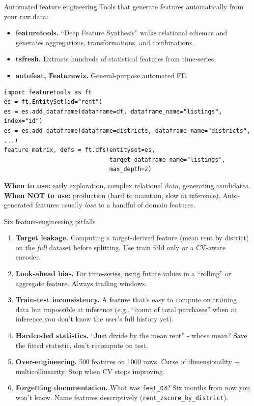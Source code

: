 \documentclass[aspectratio=169]{beamer}
\begin{document}
\begin{frame}[fragile]{Automated feature engineering}
  Tools that generate features automatically from your raw data:
  \vfill
  \begin{itemize}
    \item \textbf{featuretools.} ``Deep Feature Synthesis'' walks relational schemas and generates aggregations, transformations, and combinations.
    \item \textbf{tsfresh.} Extracts hundreds of statistical features from time-series.
    \item \textbf{autofeat, Featurewiz.} General-purpose automated FE.
  \end{itemize}
  \vfill
{\lstset{basicstyle=\ttfamily\scriptsize}
\begin{lstlisting}
import featuretools as ft
es = ft.EntitySet(id="rent")
es = es.add_dataframe(dataframe=df, dataframe_name="listings", index="id")
es = es.add_dataframe(dataframe=districts, dataframe_name="districts", ...)
feature_matrix, defs = ft.dfs(entityset=es,
                              target_dataframe_name="listings",
                              max_depth=2)
\end{lstlisting}}
  \vfill
  \footnotesize \textbf{When to use:} early exploration, complex relational data, generating candidates.\\
  \textbf{When NOT to use:} production (hard to maintain, slow at inference). Auto-generated features usually \emph{lose} to a handful of domain features.
\end{frame}

\begin{frame}{Six feature-engineering pitfalls}
  \begin{enumerate}
    \item \textbf{Target leakage.} Computing a target-derived feature (mean rent by district) on the \emph{full} dataset before splitting. Use train fold only or a CV-aware encoder.
    \item \textbf{Look-ahead bias.} For time-series, using future values in a ``rolling'' or aggregate feature. Always trailing windows.
    \item \textbf{Train-test inconsistency.} A feature that's easy to compute on training data but impossible at inference (e.g., ``count of total purchases'' when at inference you don't know the user's full history yet).
    \item \textbf{Hardcoded statistics.} ``Just divide by the mean rent'' - whose mean? Save the fitted statistic, don't recompute on test.
    \item \textbf{Over-engineering.} 500 features on 1000 rows. Curse of dimensionality + multicollinearity. Stop when CV stops improving.
    \item \textbf{Forgetting documentation.} What was \texttt{feat\_03}? Six months from now you won't know. Name features descriptively (\texttt{rent\_zscore\_by\_district}).
  \end{enumerate}
\end{frame}
\end{document}
